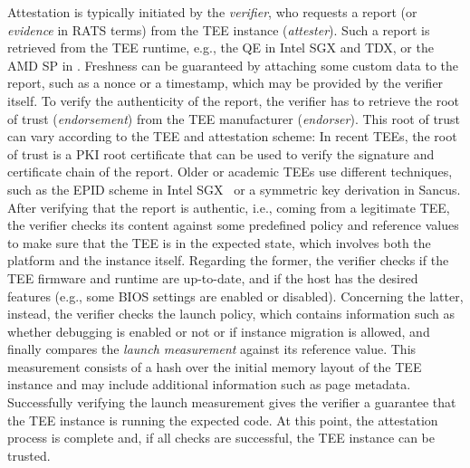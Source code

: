 Attestation is typically initiated by the \emph{verifier}, who requests a report
(or \emph{evidence} in \ac{RATS} terms) from the \ac{TEE} instance
(\emph{attester}). Such a report is retrieved from the \ac{TEE} runtime, e.g.,
the \ac{QE} in Intel \ac{SGX} and \ac{TDX}, or the AMD \ac{SP} in \sevsnp{}.
Freshness can be guaranteed by attaching some custom data to the report, such as
a nonce or a timestamp, which may be provided by the verifier itself. To verify
the authenticity of the report, the verifier has to retrieve the root of trust
(\emph{endorsement}) from the \ac{TEE} manufacturer (\emph{endorser}). This root
of trust can vary according to the \ac{TEE} and attestation scheme: In recent
\acp{TEE}, the root of trust is a \ac{PKI} root certificate that can be used to
verify the signature and certificate chain of the report. Older or academic
\acp{TEE} use different techniques, such as the \ac{EPID} scheme in Intel
\ac{SGX}~\cite{SGXexplained} or a symmetric key derivation in Sancus. After
verifying that the report is authentic, i.e., coming from a legitimate \ac{TEE},
the verifier checks its content against some predefined policy and reference
values to make sure that the \ac{TEE} is in the expected state, which involves
both the platform and the instance itself. Regarding the former, the verifier
checks if the \ac{TEE} firmware and runtime are up-to-date, and if the host has
the desired features (e.g., some BIOS settings are enabled or disabled).
Concerning the latter, instead, the verifier checks the launch policy, which
contains information such as whether debugging is enabled or not or if instance
migration is allowed, and finally compares the \emph{launch measurement} against
its reference value. This measurement consists of a hash over the initial memory
layout of the \ac{TEE} instance and may include additional information such as
page metadata. Successfully verifying the launch measurement gives the verifier
a guarantee that the \ac{TEE} instance is running the expected code. At this
point, the attestation process is complete and, if all checks are successful,
the \ac{TEE} instance can be trusted.

